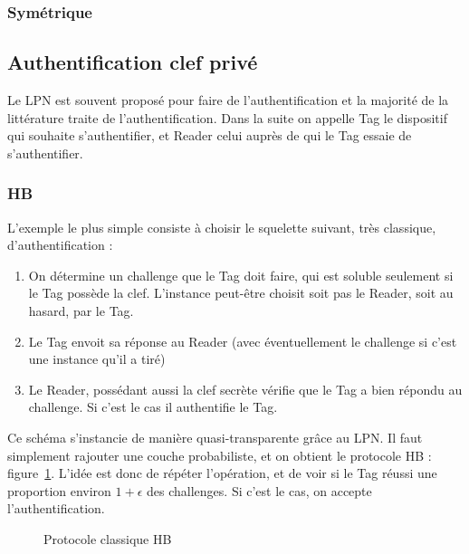 \documentclass{article}		%
\theoremstyle{definition}
\theoremstyle{plain}
\theoremstyle{plain}
\theoremstyle{plain}
\theoremstyle{plain}
\begin{document}
\subsubsection{Symétrique}





\subsection{Authentification clef privé}
Le LPN est souvent proposé pour faire de l'authentification et la majorité
de la littérature traite de l'authentification. Dans la suite on appelle
Tag le dispositif qui souhaite s'authentifier, et Reader celui auprès de qui le
Tag essaie de s'authentifier.


\subsubsection{HB}
L'exemple le plus simple consiste à choisir le squelette suivant, très
classique, d'authentification :
\begin{enumerate}
\item On détermine un challenge que le Tag doit faire, qui est soluble
seulement si le Tag possède la clef. L'instance peut-être choisit soit
pas le Reader, soit au hasard, par le Tag.
\item Le Tag envoit sa réponse au Reader (avec éventuellement le
challenge si c'est une instance qu'il a tiré)
\item Le Reader, possédant aussi la clef secrète vérifie que le Tag a
bien répondu au challenge. Si c'est le cas il authentifie le Tag.
\end{enumerate}


Ce schéma s'instancie de manière quasi-transparente grâce au LPN. Il
faut simplement rajouter une couche probabiliste, et on obtient le
protocole HB : figure~\ref{hb}. L'idée est donc de répéter l'opération,
et de voir si le Tag réussi une proportion environ $1+\epsilon$ des
challenges. Si c'est le cas, on accepte l'authentification.
\begin{figure}
\centering
{}
\caption{Protocole classique HB}
\label{hb}
\end{figure}
\end{document}
